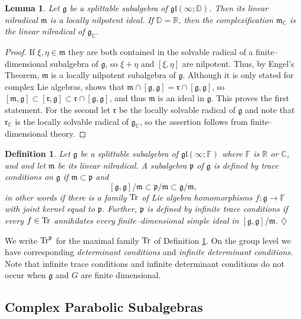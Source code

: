 \documentclass[oneside,leqno,11pt]{article}
\def\gg{\mathfrak{g}}
\def\ggl{\mathfrak{gl}}
\def\gm{\mathfrak{m}}
\def\gp{\mathfrak{p}}
\def\gr{\mathfrak{r}}
\def\Tr{{\rm Tr}}
\def\C{\mathbb{C}}
\def\D{\mathbb{D}}
\def\F{\mathbb{F}}
\def\R{\mathbb{R}}
\newtheorem{lemma}[equation]{Lemma}
\newtheorem{definition}[equation]{Definition}
\begin{document}
\begin{lemma}\label{lin-nilrad}
Let $\gg$ be a splittable subalgebra of $\ggl(\infty;\D)$.  Then its
linear nilradical $\gm$ is a locally nilpotent ideal.  If $\D = \R$, then
 the complexification $\gm_\C$ is the linear nilradical
of $\gg_\C$.
\end{lemma}


\begin{proof}
If $\xi, \eta \in \gm$ they are both contained in the solvable radical
of a finite--dimensional subalgebra of $\gg$, so $\xi + \eta$ and
$[\xi,\eta]$ are nilpotent.  Thus, by Engel's Theorem, $\gm$ is a locally nilpotent subalgebra
of $\gg$.  Although
it is only stated for complex Lie algebras, \cite[Proposition 2.1]{DC2}
shows that $\gm \cap [\gg,\gg] = \gr \cap [\gg,\gg]$, so
$[\gm,\gg]\subset [\gr,\gg] \subset \gr \cap [\gg,\gg]$, and thus $\gm$ is an
ideal in $\gg$.  This proves the first statement.  For the second let $\gr$ be the
locally solvable radical of $\gg$ and note that $\gr_\C$ is the locally
solvable radical of $\gg_\C$, so the assertion follows from finite--dimensional theory. 
\end{proof}


\begin{definition} \label{def-trace-cond}
Let $\gg$ be a splittable subalgebra of $\ggl(\infty;\F)$ where $\F$ is $\R$ or $\C$, and
and let $\gm$ be its linear nilradical.
A subalgebra $\gp$ of $\gg$ is \emph{defined by trace conditions on $\gg$} if 
$\gm \subset \gp$  and  
$$[\gg,\gg]/\gm \subset \gp/\gm \subset \gg/\gm,$$
in other words if there is a family $\Tr$ of Lie algebra homomorphisms
$f: \gg \to \F$ 
with joint kernel equal to $\gp$.  Further, $\gp$ is {\em defined by infinite trace conditions}
if every $f \in \Tr$ annihilates every finite--dimensional simple ideal
in $[\gg,\gg]/\gm$. \hfill $\diamondsuit$
\end{definition}


We write $\Tr^\gp$ for the maximal family $\Tr$ of Definition 
\ref{def-trace-cond}.  On the group level we have corresponding
{\em determinant conditions} and {\em infinite determinant conditions}.
Note that infinite trace conditions and infinite determinant conditions
do not occur when $\gg$ and $G$ are finite dimensional. 

\subsection{Complex Parabolic Subalgebras} \label{sec2C}
\end{document}
